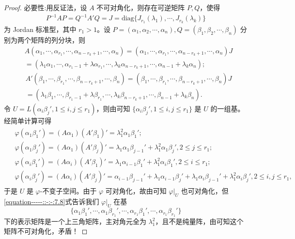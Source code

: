 \documentclass[../../main.tex]{subfiles}%
\begin{document}
\begin{proof}
{\heiti 必要性:}用反证法，设 $A$ 不可对角化，则存在可逆矩阵 $P,Q$，使得
\begin{align*}
P^{-1}AP = Q^{-1}A'Q = J = \mathrm{diag}\{J_{r_1}(\lambda_1),\cdots,J_{r_k}(\lambda_k)\}
\end{align*}
为 Jordan 标准型，其中 $r_1 > 1$。设 $P = (\alpha_1,\alpha_2,\cdots,\alpha_n),Q = (\beta_1,\beta_2,\cdots,\beta_n)$ 分别为两个矩阵的列分块，则
\begin{align*}
&A\left( \alpha _1,\cdots ,\alpha _{r_1},\cdots ,\alpha _{n-r_k+1},\cdots ,\alpha _n \right) =\left( \alpha _1,\cdots ,\alpha _{r_1},\cdots ,\alpha _{n-r_k+1},\cdots ,\alpha _n \right) J
\\
&=\left( \lambda _1\alpha _1,\cdots ,\alpha _{r_1-1}+\lambda \alpha _{r_1},\cdots ,\lambda _k\alpha _{n-r_k+1},\cdots ,\alpha _{n-1}+\lambda _k\alpha _n \right) ;
\end{align*}
\begin{align*}
&A'\left( \beta _1,\cdots ,\beta _{r_1},\cdots ,\beta _{n-r_k+1},\cdots ,\beta _n \right) =\left( \beta _1,\cdots ,\beta _{r_1},\cdots ,\beta _{n-r_k+1},\cdots ,\beta _n \right) J
\\
&=\left( \lambda _1\beta _1,\cdots ,\beta _{r_1-1}+\lambda \beta _{r_1},\cdots ,\lambda _k\beta _{n-r_k+1},\cdots ,\beta _{n-1}+\lambda _k\beta _n \right) .
\end{align*}
令 $U = L(\alpha_i\beta_j',1\leqslant  i,j\leqslant  r_1)$，则由可知 $\{\alpha_i\beta_j',1\leqslant  i,j\leqslant  r_1\}$ 是 $U$ 的一组基。经简单计算可得
\begin{gather}\label{equation-----::-:-:7.8}
\begin{aligned}
&\varphi (\alpha _1\beta _1')=\left( A\alpha _1 \right) \left( A'\beta _1 \right) '=\lambda _{1}^{2}\alpha _1\beta _1';
\\
&\varphi (\alpha _1\beta _j')=\left( A\alpha _1 \right) \left( A'\beta _j \right) '=\lambda _1\alpha _1\beta _{j-1}'+\lambda _{1}^{2}\alpha _1\beta _j', 2\leqslant j\leqslant r_1;
\\
&\varphi (\alpha _i\beta _1')=\left( A\alpha _i \right) \left( A'\beta _1 \right) '=\lambda _1\alpha _{i-1}\beta _1'+\lambda _{1}^{2}\alpha _i\beta _1', 2\leqslant i\leqslant r_1;
\\
&\varphi (\alpha _i\beta _j')=\left( A\alpha _i \right) \left( A'\beta _j \right) '=\alpha _{i-1}\beta _{j-1}'+\lambda _1\alpha _{i-1}\beta _j'+\lambda _1\alpha _i\beta _{j-1}'+\lambda _{1}^{2}\alpha _i\beta _j', 2\leqslant i,j\leqslant r_1,
\end{aligned}
\end{gather}
于是 $U$ 是 $\varphi$-不变子空间。由于 $\varphi$ 可对角化，故由可知 $\varphi|_U$ 也可对角化，但\eqref{equation-----::-:-:7.8}式告诉我们 $\varphi|_U$ 在基 $$\{\alpha_1\beta_1',\cdots,\alpha_1\beta_{r_1}',\cdots,\alpha_{r_1}\beta_1',\cdots,\alpha_{r_1}\beta_{r_1}'\}$$ 下的表示矩阵是一个上三角矩阵，主对角元全为 $\lambda_1^2$，且不是纯量阵，由可知这个矩阵不可对角化，矛盾！
\end{proof}
\end{document}
